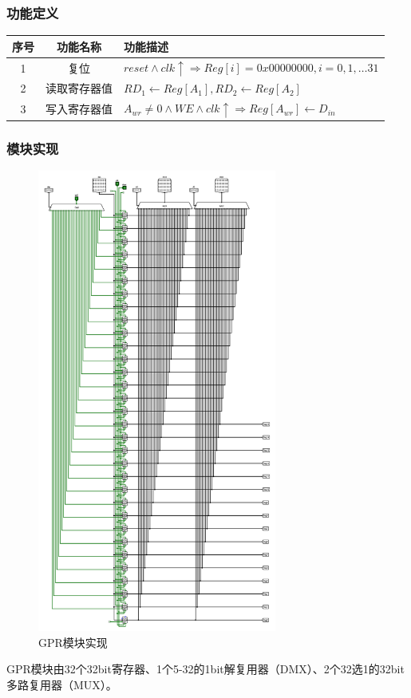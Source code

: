 \documentclass[main.tex]{subfiles}
\begin{document}
\subsubsection{功能定义}
\begin{center}
    \begin{tabular}{c c l}
        \toprule
        序号 & 功能名称 & 功能描述 \\
        \midrule
        1 & 复位 & $reset \land clk\uparrow \Rightarrow  Reg[i] = 0x00000000, i=0, 1, \dots 31 $ \\
        2 & 读取寄存器值 & $ RD_1 \leftarrow Reg[A_1], RD_2 \leftarrow Reg[A_2] $ \\
        3 & 写入寄存器值 & $A_{wr} \neq 0 \land WE \land clk\uparrow \Rightarrow Reg[A_{wr}] \leftarrow D_{in}$ \\
        \bottomrule
    \end{tabular}
\end{center}

\subsubsection{模块实现}
\begin{figure}[h]
\centering
\includegraphics[width=0.7\textwidth]{images/GPR-circuit.png}
\caption{GPR模块实现}
\end{figure}
GPR模块由32个32bit寄存器、1个5-32的1bit解复用器（DMX）、2个32选1的32bit多路复用器（MUX）。
\end{document}
